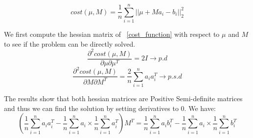 \documentclass[runningheads]{llncs}
\begin{document}
\begin{equation}
\label{cost_function}
    cost(\mu, M) = \frac{1}{n}\sum_{i=1}^n||\mu + Ma_i - b_i||_2^2
\end{equation}

We first compute the hessian matrix of ~\ref{cost_function} with respect to $\mu$ and $M$ to see if the problem can be directly solved.
\begin{equation}
\label{hessian_1}
    \frac{\partial^2 cost(\mu, M)}{\partial \mu \partial \mu^T} = 2I \rightarrow p.d
\end{equation}
\begin{equation}
\label{hessian_2}
    \frac{\partial^2 cost(\mu, M)}{\partial M \partial M^T} = \frac{2}{n}\sum_{i=1}^na_ia_i^T \rightarrow p.s.d
\end{equation}

The results show that both hessian matrices are Positive Semi-definite matrices and thus we can find the solution by setting derivatives to 0. We have:
\begin{equation}
    (\frac{1}{n}\sum_{i=1}^na_ia_i^T - \frac{1}{n}\sum_{i=1}^na_i\times \frac{1}{n}\sum_{i=1}^na_i^T)M^T = \frac{1}{n}\sum_{i=1}^na_ib_i^T - \frac{1}{n}\sum_{i=1}^na_i\times \frac{1}{n}\sum_{i=1}^nb_i^T
\end{equation}
\end{document}
